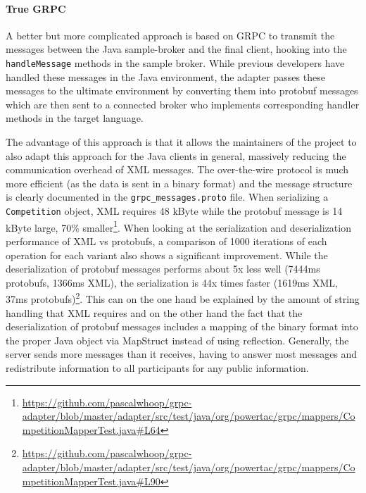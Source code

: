 \paragraph{True GRPC}%
\label{sub:grpc_based_communication}

A better but more complicated approach is based on \ac{GRPC} to transmit the messages between the Java sample-broker and
the final client, hooking into the \texttt{handleMessage} methods in the sample broker.
While previous developers have handled these messages in the Java environment, the adapter passes these messages to the ultimate
environment by converting them into protobuf messages which are then sent to a connected broker who implements
corresponding handler methods in the target language.

The advantage of this approach is that it allows the maintainers of the project to also adapt this approach for the
Java clients in general, massively reducing the communication overhead of \ac{XML} messages. The over-the-wire protocol
is much more
efficient (as the data is sent in a binary format) and the message structure is clearly documented in the
\texttt{grpc\_messages.proto} file. When serializing a \texttt{Competition} object, \ac{XML} requires 48 kByte while
the protobuf message is 14 kByte large, 70\%
smaller\footnote{\url{https://github.com/pascalwhoop/grpc-adapter/blob/master/adapter/src/test/java/org/powertac/grpc/mappers/CompetitionMapperTest.java\#L64}}.
When looking at the serialization and deserialization performance of \ac{XML} vs protobufs, a comparison of 1000
iterations of each operation for each variant also shows a significant improvement. While the deserialization of
protobuf messages performs about 5x less well (7444ms protobufs, 1366ms \ac{XML}), the serialization is 44x times
faster (1619ms \ac{XML}, 37ms
protobufs)\footnote{\url{https://github.com/pascalwhoop/grpc-adapter/blob/master/adapter/src/test/java/org/powertac/grpc/mappers/CompetitionMapperTest.java\#L90}}.
This can on the one hand be explained by the amount of string handling that \ac{XML} requires and on the other hand the fact that the
deserialization of protobuf messages includes a mapping of the binary format into the proper Java object via MapStruct instead
of using reflection. Generally, the server sends more messages than it receives, having to answer most messages and
redistribute information to all participants for any public information.


